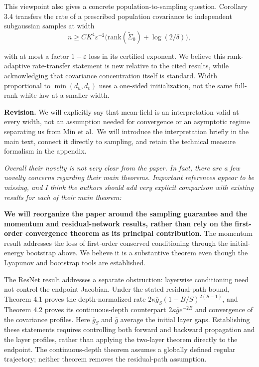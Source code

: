 \documentclass[11pt,a4paper]{article}
\renewenvironment{quote}
  {\par\addvspace{0.8em}\Needspace{8\baselineskip}%
    \list{}{\leftmargin=1.2em\rightmargin=0pt\topsep=0.25em
    \parsep=0.3em}\item\relax\normalsize\itshape\color{quotegray}}
  {\endlist\nopagebreak[4]}
\begin{document}
This viewpoint also gives a concrete population-to-sampling question. Corollary 3.4 transfers the rate of a prescribed population covariance to independent subgaussian samples at width
\[
n\ge CK^4\varepsilon^{-2}\bigl(\mathrm{rank}(\widetilde\Sigma_0)+\log(2/\delta)\bigr),
\]

with at most a factor \(1-\varepsilon\) loss in its certified exponent. We believe this rank-adaptive rate-transfer statement is new relative to the cited results, while acknowledging that covariance concentration itself is standard. Width proportional to \(\min(d_u,d_v)\) uses a one-sided initialization, not the same full-rank white law at a smaller width.

\textbf{Revision.} We will explicitly say that mean-field is an interpretation valid at every width, not an assumption needed for convergence or an asymptotic regime separating us from Min et al.~We will introduce the interpretation briefly in the main text, connect it directly to sampling, and retain the technical measure formalism in the appendix.

\begin{quote}
Overall their novelty is not very clear from the paper. In fact, there are a few novelty concerns regarding their main theorems. Important references appear to be missing, and I think the authors should add very explicit comparison with existing results for each of their main theorem:
\end{quote}

\textbf{We will reorganize the paper around the sampling guarantee and the momentum and residual-network results, rather than rely on the first-order convergence theorem as its principal contribution.} The momentum result addresses the loss of first-order conserved conditioning through the initial-energy bootstrap above. We believe it is a substantive theorem even though the Lyapunov and bootstrap tools are established.

The ResNet result addresses a separate obstruction: layerwise conditioning need not control the endpoint Jacobian. Under the stated residual-path bound, Theorem 4.1 proves the depth-normalized rate \(2\kappa\overline g_S(1-B/S)^{2(S-1)}\), and Theorem 4.2 proves its continuous-depth counterpart \(2\kappa\overline g e^{-2B}\) and convergence of the covariance profiles. Here \(\overline g_S\) and \(\overline g\) average the initial layer gaps. Establishing these statements requires controlling both forward and backward propagation and the layer profiles, rather than applying the two-layer theorem directly to the endpoint. The continuous-depth theorem assumes a globally defined regular trajectory; neither theorem removes the residual-path assumption.
\end{document}
